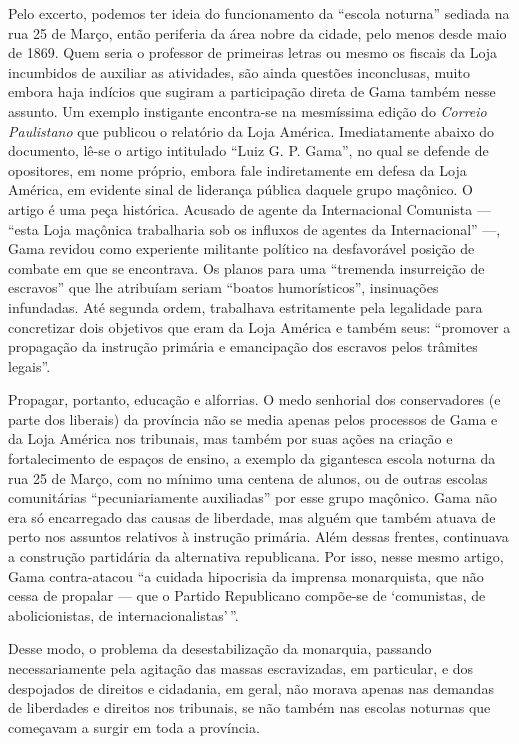 Pelo excerto, podemos ter ideia do funcionamento da ``escola noturna''
sediada na rua 25 de Março, então periferia da área nobre da cidade,
pelo menos desde maio de 1869. Quem seria o professor de primeiras
letras ou mesmo os fiscais da Loja incumbidos de auxiliar as atividades,
são ainda questões inconclusas, muito embora haja indícios que sugiram a
participação direta de Gama também nesse assunto. Um exemplo instigante
encontra-se na mesmíssima edição do \emph{Correio Paulistano} que
publicou o relatório da Loja América. Imediatamente abaixo do documento,
lê-se o artigo intitulado ``Luiz G. P. Gama'', no qual se defende de
opositores, em nome próprio, embora fale indiretamente em defesa
da Loja América, em evidente sinal de liderança pública daquele grupo
maçônico. O artigo é uma peça histórica. Acusado de agente da
Internacional Comunista --- ``esta Loja maçônica
trabalharia sob os influxos de agentes da Internacional'' ---, Gama
revidou como experiente militante político na desfavorável posição de
combate em que se encontrava. Os planos para uma ``tremenda insurreição
de escravos'' que lhe atribuíam seriam ``boatos humorísticos'',
insinuações infundadas. Até segunda ordem, trabalhava estritamente pela
legalidade para concretizar dois objetivos que eram da Loja América e
também seus: ``promover a propagação da instrução primária e emancipação
dos escravos pelos trâmites legais''.

Propagar, portanto, educação e alforrias. O medo senhorial dos
conservadores (e parte dos liberais) da província não se media apenas
pelos processos de Gama e da Loja América nos tribunais, mas também por
suas ações na criação e fortalecimento de espaços de ensino, a exemplo
da gigantesca escola noturna da rua 25 de Março, com no mínimo uma
centena de alunos, ou de outras escolas comunitárias ``pecuniariamente
auxiliadas'' por esse grupo maçônico. Gama não era só encarregado das
causas de liberdade, mas alguém que também atuava de perto nos assuntos
relativos à instrução primária. Além dessas frentes, continuava a
construção partidária da alternativa republicana. Por isso, nesse mesmo
artigo, Gama contra-atacou ``a cuidada hipocrisia da imprensa
monarquista, que não cessa de propalar --- que o Partido Republicano
compõe-se de `comunistas, de abolicionistas, de internacionalistas'\,''.

Desse modo, o problema da desestabilização da monarquia, passando
necessariamente pela agitação das massas escravizadas, em particular, e
dos despojados de direitos e cidadania, em geral, não morava apenas nas
demandas de liberdades e direitos nos tribunais, se não também nas
escolas noturnas que começavam a surgir em toda a província.

